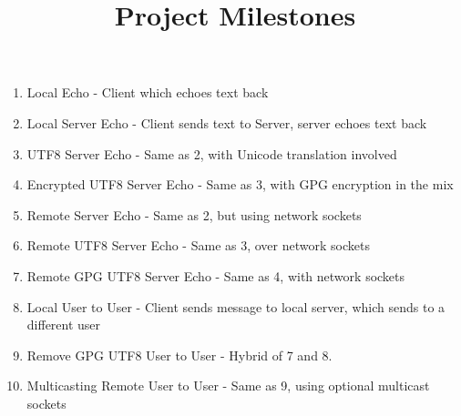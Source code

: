 \documentclass[a4paper,12pt]{article}
\begin{document}
\title{Project Milestones}

\maketitle 

\begin{enumerate}

\item Local Echo - Client which echoes text back

\item Local Server Echo - Client sends text to Server, server echoes text
back

\item UTF8 Server Echo - Same as 2, with Unicode translation involved

\item Encrypted UTF8 Server Echo - Same as 3, with GPG encryption in the
mix

\item Remote Server Echo - Same as 2, but using network sockets

\item Remote UTF8 Server Echo - Same as 3, over network sockets

\item Remote GPG UTF8 Server Echo - Same as 4, with network sockets

\item Local User to User - Client sends message to local server, which
sends to a different user

\item Remove GPG UTF8 User to User - Hybrid of 7 and 8.

\item Multicasting Remote User to User - Same as 9, using optional
multicast sockets

\end{enumerate}
\end{document}

